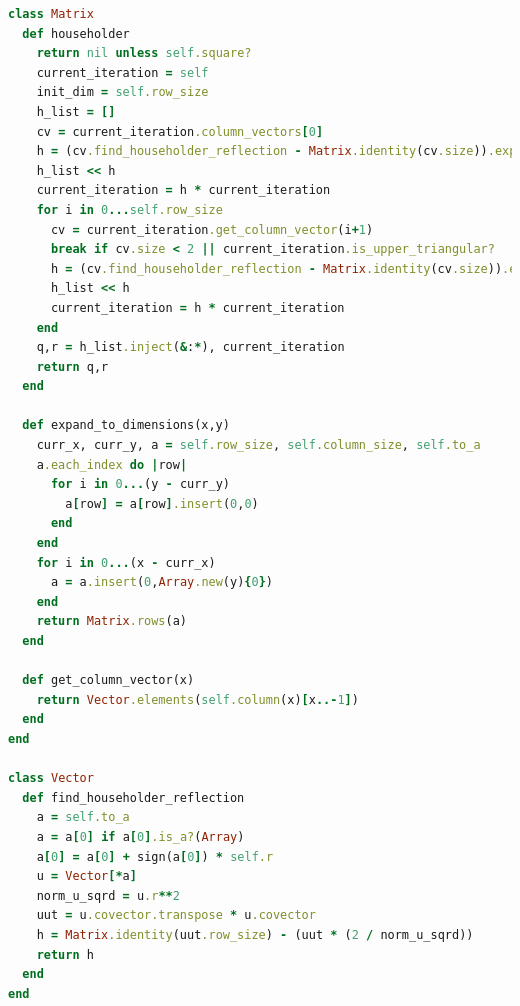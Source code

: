 \documentclass[letterpaper,12pt]{article}
\begin{document}
\lstset{caption=QR Decomposition via Householder Reflections}
\begin{lstlisting}[language=ruby]
class Matrix
  def householder
    return nil unless self.square?
    current_iteration = self
    init_dim = self.row_size
    h_list = []
    cv = current_iteration.column_vectors[0]
    h = (cv.find_householder_reflection - Matrix.identity(cv.size)).expand_to_dimensions(init_dim,init_dim) + Matrix.identity(init_dim)
    h_list << h
    current_iteration = h * current_iteration
    for i in 0...self.row_size
      cv = current_iteration.get_column_vector(i+1)
      break if cv.size < 2 || current_iteration.is_upper_triangular?
      h = (cv.find_householder_reflection - Matrix.identity(cv.size)).expand_to_dimensions(init_dim,init_dim) + Matrix.identity(init_dim)
      h_list << h
      current_iteration = h * current_iteration
    end
    q,r = h_list.inject(&:*), current_iteration
    return q,r
  end

  def expand_to_dimensions(x,y)
    curr_x, curr_y, a = self.row_size, self.column_size, self.to_a
    a.each_index do |row|
      for i in 0...(y - curr_y)
        a[row] = a[row].insert(0,0)
      end
    end
    for i in 0...(x - curr_x)
      a = a.insert(0,Array.new(y){0})
    end
    return Matrix.rows(a)
  end

  def get_column_vector(x)
    return Vector.elements(self.column(x)[x..-1])
  end
end

class Vector
  def find_householder_reflection
    a = self.to_a
    a = a[0] if a[0].is_a?(Array)
    a[0] = a[0] + sign(a[0]) * self.r
    u = Vector[*a]
    norm_u_sqrd = u.r**2
    uut = u.covector.transpose * u.covector
    h = Matrix.identity(uut.row_size) - (uut * (2 / norm_u_sqrd))
    return h
  end
end
\end{lstlisting}
\end{document}
